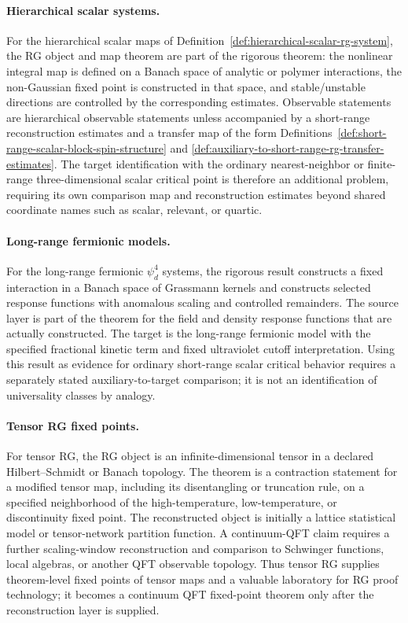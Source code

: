 \paragraph{Hierarchical scalar systems.}
For the hierarchical scalar maps of
Definition~\ref{def:hierarchical-scalar-rg-system}, the RG object and map
theorem are part of the rigorous theorem: the nonlinear integral map is
defined on a Banach space of analytic or polymer interactions, the
non-Gaussian fixed point is constructed in that space, and stable/unstable
directions are controlled by the corresponding estimates.  Observable
statements are hierarchical observable statements unless accompanied by a
short-range reconstruction estimates and a transfer map of the form
Definitions~\ref{def:short-range-scalar-block-spin-structure} and
\ref{def:auxiliary-to-short-range-rg-transfer-estimates}.  The target
identification with the ordinary nearest-neighbor or finite-range
three-dimensional scalar critical point is therefore an additional problem,
requiring its own comparison map and reconstruction estimates beyond shared
coordinate names such as scalar, relevant, or quartic.

\paragraph{Long-range fermionic models.}
For the long-range fermionic \(\psi^4_d\) systems, the rigorous result
constructs a fixed interaction in a Banach space of Grassmann kernels and
constructs selected response functions with anomalous scaling and controlled
remainders.  The source layer is part of the theorem for the field and
density response functions that are actually constructed.  The target is the
long-range fermionic model with the specified fractional kinetic term and
fixed ultraviolet cutoff interpretation.  Using this result as evidence for
ordinary short-range scalar critical behavior requires a separately stated
auxiliary-to-target comparison; it is not an identification of universality
classes by analogy.

\paragraph{Tensor RG fixed points.}
For tensor RG, the RG object is an infinite-dimensional tensor in a declared
Hilbert--Schmidt or Banach topology.  The theorem is a contraction statement
for a modified tensor map, including its disentangling or truncation rule,
on a specified neighborhood of the high-temperature, low-temperature, or
discontinuity fixed point.  The reconstructed object is initially a lattice
statistical model or tensor-network partition function.  A continuum-QFT
claim requires a further scaling-window reconstruction and comparison to
Schwinger functions, local algebras, or another QFT observable topology.
Thus tensor RG supplies theorem-level fixed points of tensor maps and a
valuable laboratory for RG proof technology; it becomes a continuum QFT
fixed-point theorem only after the reconstruction layer is supplied.

